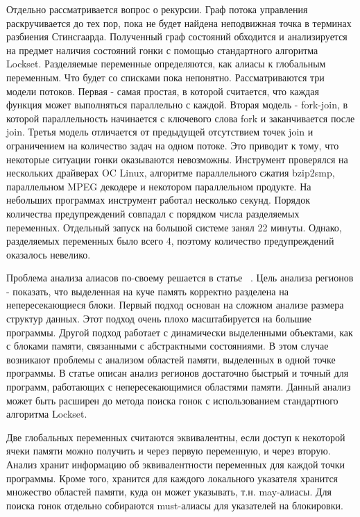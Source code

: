 Отдельно рассматривается вопрос о рекурсии. Граф потока управления раскручивается до тех пор, пока не будет найдена неподвижная точка в терминах разбиения Стинсгаарда.
Полученный граф состояний обходится и анализируется на предмет наличия состояний гонки с помощью стандартного алгоритма Lockset.
Разделяемые переменные определяются, как алиасы к глобальным переменным. Что будет со списками пока непонятно.
Рассматриваются три модели потоков. Первая - самая простая, в которой считается, что каждая функция может выполняться параллельно с каждой.
Вторая модель - fork-join, в которой параллельность начинается с ключевого слова fork и заканчивается после join.
Третья модель отличается от предыдущей отсутствием точек join и ограничением на количество задач на одном потоке.
Это приводит к тому, что некоторые ситуации гонки оказываются невозможны.
Инструмент проверялся на нескольких драйверах OC Linux, алгоритме параллельного сжатия bzip2smp, параллельном MPEG декодере и некотором параллельном продукте. На небольших программах инструмент работал несколько секунд.
Порядок количества предупреждений совпадал с порядком числа разделяемых переменных. Отдельный запуск на большой системе занял 22 минуты.
Однако, разделяемых переменных было всего 4, поэтому количество предупреждений оказалось невелико. 

Проблема анализа алиасов по-своему решается в статье ~\cite{Seidl:2009}.
Цель анализа регионов - показать, что выделенная на куче память корректно разделена на непересекающиеся блоки.
Первый подход основан на сложном анализе размера структур данных. Этот подход очень плохо масштабируется на большие программы.
Другой подход работает с динамически выделенными объектами, как с блоками памяти, связанными с абстрактными состояниями.
В этом случае возникают проблемы с анализом областей памяти, выделенных в одной точке программы.
В статье описан анализ регионов достаточно быстрый и точный для программ, работающих с непересекающимися областями памяти.
Данный анализ может быть расширен до метода поиска гонок с использованием стандартного алгоритма Lockset. 

Две глобальных переменных считаются эквивалентны, если доступ к некоторой ячеки памяти можно получить и через первую переменную, и через вторую.
Анализ хранит информацию об эквивалентности переменных для каждой точки программы.
Кроме того, хранится для каждого локального указателя хранится множество областей памяти, куда он может указывать, т.н. may-алиасы.
Для поиска гонок отдельно собираются must-алиасы для указателей на блокировки. 


